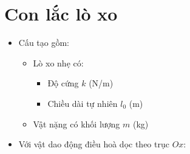 \documentclass[12pt]{article}
\begin{document}
	\newpage
	\section{Con lắc lò xo}
		\vspace{6pt}
		\begin{itemize}
			\item Cấu tạo gồm:
				\vspace{-5pt}
				\begin{itemize}[label=\textopenbullet]
					\item Lò xo nhẹ có:
						\vspace{-2pt}
						\begin{itemize}[label=\tiny\ensuremath{\blacksquare}]
							\item Độ cứng \(k\) (N/m)
							\item Chiều dài tự nhiên \(l_0\) (m)
						\end{itemize}
					\item Vật nặng có khối lượng \(m\) (kg)
				\end{itemize}
			\item Với vật dao động điều hoà dọc theo trục \(Ox\):
		\end{itemize}
\end{document}
